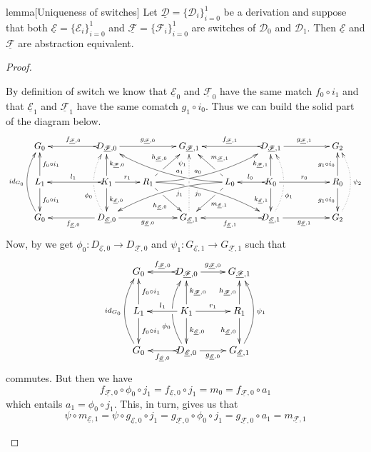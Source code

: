 \documentclass[a4paper,UKenglish,cleveref,pdftex, thm-restate,numberwithinsect]{lipics}
\newcommand{\id}[1]{\mathsf{id}_{#1}}
\newcommand{\dder}[1]{\mathscr{#1}}
\newcommand{\der}[1]{\underline{\dder{#1}}}
\begin{document}
{\begin{theoremEnd}[category=sec3]{lemma}[Uniqueness of switches]\label{thm:switch_uni} Let $\der{D}=\{\dder{D}_{i}\}_{i=0}^1$ be a derivation and suppose that both $\der{E}=\{\dder{E}_i\}_{i=0}^1$  and $\der{F}=\{\dder{F}_i\}_{i=0}^1$ are switches of $\dder{D}_0$ and $\dder{D}_1$. Then $\der{E}$ and $\der{F}$ are abstraction equivalent.
\end{theoremEnd}
\begin{proof}
	\begin{proofEnd}		
		By definition of switch we know that $\der{E}_0$ and $\der{F}_0$ have the same match $f_0\circ i_1$ and that $\der{E}_1$ and $\der{F}_1$ have the same comatch $g_1\circ i_0$. Thus we can build the solid part of the diagram below.
		\[\xymatrix@C=22pt{G_{0} && \ar@{>->}[ll]_{f_{\der{F},0}} D_{\der{F},0} \ar[rr]^{g_{\der{F},0}}&& G_{\der{F},1} && \ar@{>->}[ll]_{f_{\der{F},1}} D_{\der{F},1} \ar[rr]^{g_{\der{F},1}}&& G_{2}\\L_1 \ar[d]^{f_0\circ i_1} \ar[u]_{f_0\circ i_1}&& K_{1} \ar[d]^{k_{\der{E},0}} \ar[u]_{k_{\der{F},0}}\ar@{>->}[ll]_{l_1} \ar[r]^{r_1} & R_{1} \ar@/^.35cm/[drrr]|(.3)\hole_(.4){j_0} \ar[dr]|(.3)\hole_{h_{\der{E},0}} \ar@/_.35cm/[urrr]|(.3)\hole^(.4){a_0} \ar[ur]|(.3)\hole^{h_{\der{F},0}}& &L_{0} \ar@/_.35cm/[dlll]^(.4){j_1} \ar[dl]|(.3)\hole^{m_{\der{E},1}} \ar@/^.35cm/[ulll]_(.4){a_1} \ar[ul]|(.3)\hole_{m_{\der{F},1}}& K_{0} \ar[d]_{k_{\der{E},1}} \ar[u]^{k_{\der{F},1}}\ar@{>->}[l]_{l_{0}} \ar[rr]^{r_0} && R_{0} \ar[d]_{g_1\circ i_0} \ar[u]^{g_1\circ i_0}\\ \ar@/^.5cm/[uu]^{\id{G_0}} G_{0} && \ar[ll]^{f_{\der{E},0}} D_{\der{E},0} \ar@{.>}@/^.5cm/[uu]^(.33){\phi_{0}}|\hole \ar[rr]_{g_{\der{E},0}}&& G_{\der{E},1} \ar@{.>}[uu]^(.76){\psi_1}|(.45)\hole |(.55)\hole&& \ar@{>->}[ll]^{f_{\der{E},1}} D_{\der{E},1} \ar@{.>}@/_.5cm/[uu]_(.33){\phi_{1}}|\hole\ar[rr]_{g_{\der{E},1}}&& G_{2}\ar@{.>}@/_.5cm/[uu]_{\psi_2}}\]
		Now, by  we get $\phi_0\colon D_{\der{E},0}\to D_{\der{F},0}$ and $\psi_1 \colon G_{\der{E},1}\to G_{\der{F},1}$ such that 
		\[\xymatrix{G_{0} & \ar@{>->}[l]_{f_{\der{F},0}} D_{\der{F},0} \ar[r]^{g_{\der{F},0}}& G_{\der{F},1} \\L_1 \ar[d]^{f_0\circ i_1} \ar[u]_{f_0\circ i_1}& K_{1} \ar[d]^{k_{\der{E},0}} \ar[u]_{k_{\der{F},0}}\ar[l]_{l_1} \ar[r]^{r_1} & R_{1}  \ar[d]_{h_{\der{E},0}}  \ar[u]^{h_{\der{F},0}}\\ \ar@/^.5cm/[uu]^{\id{G_0}} G_{0} & \ar@{>->}[l]^{f_{\der{E},0}} D_{\der{E},0} \ar@/^.5cm/[uu]^(.33){\phi_{0}}|\hole \ar[r]_{g_{\der{E},0}}& G_{\der{E},1} \ar@/_.5cm/[uu]_{\psi_1}}\]
		commutes. But then we have
		\[
		f_{\der{F},0}\circ \phi_0\circ j_1=f_{\der{E},0} \circ j_1=m_0=f_{\der{F},0}\circ a_1\]
		which entails $a_1= \phi_0\circ j_1$. This, in turn, gives us that
		\[\psi\circ m_{\der{E},1}=\psi \circ g_{\der{E},0}\circ j_1=g_{\der{F},0}\circ \phi_0\circ j_1=g_{\der{F},0}\circ a_1=m_{\der{F},1}\]
		

\end{proofEnd}
\end{proof}}
\end{document}
